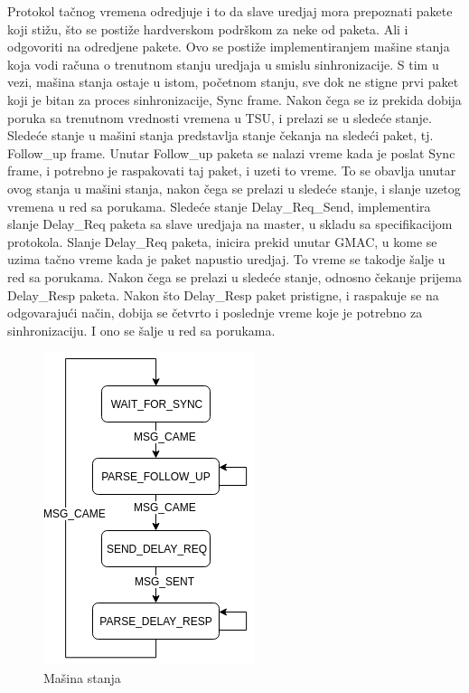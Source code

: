 \documentclass[a4paper,12pt, master]{etf}
\begin{document}
	Protokol ta\v{c}nog vremena odredjuje i to da slave uredjaj mora prepoznati
	pakete koji sti\v{z}u, \v{s}to se posti\v{z}e hardverskom podr\v{s}kom za
	neke od paketa. Ali i odgovoriti na odredjene pakete. Ovo se posti\v{z}e
	implementiranjem ma\v{s}ine stanja koja vodi ra\v{c}una o trenutnom stanju
	uredjaja u smislu sinhronizacije. S tim u vezi, ma\v{s}ina stanja ostaje u
	istom, po\v{c}etnom stanju, sve dok ne stigne prvi paket koji je bitan za
	proces sinhronizacije, Sync frame. Nakon \v{c}ega se iz prekida dobija
	poruka sa trenutnom vrednosti vremena u TSU, i prelazi se u slede\'{c}e
	stanje. Slede\'{c}e stanje u ma\v{s}ini stanja predstavlja stanje
	\v{c}ekanja na slede\'{c}i paket, tj. Follow\_up frame. Unutar Follow\_up
	paketa se nalazi vreme kada je poslat Sync frame, i potrebno je raspakovati
	taj paket, i uzeti to vreme. To se obavlja unutar ovog stanja u ma\v{s}ini
	stanja, nakon \v{c}ega se prelazi u slede\'{c}e stanje, i slanje uzetog
	vremena u red sa porukama. Slede\'{c}e stanje Delay\_Req\_Send,
	implementira slanje Delay\_Req paketa sa slave uredjaja na master, u skladu
	sa specifikacijom protokola. Slanje Delay\_Req paketa, inicira prekid
	unutar GMAC, u kome se uzima ta\v{c}no vreme kada je paket napustio
	uredjaj. To vreme se takodje \v{s}alje u red sa porukama. Nakon \v{c}ega se
	prelazi u slede\'{c}e stanje, odnosno \v{c}ekanje prijema Delay\_Resp
	paketa. Nakon \v{s}to Delay\_Resp paket pristigne, i raspakuje se na
	odgovaraju\'{c}i na\v{c}in, dobija se \v{c}etvrto i poslednje vreme koje je
	potrebno za sinhronizaciju. I ono se \v{s}alje u red sa porukama.

	\begin{figure}[htb]
			\centering
			\includegraphics[scale=.7]{../pic/state_machine.png}
            \caption{Ma\v{s}ina stanja}
			\label{fig:state_machine}
	\end{figure}
\end{document}
